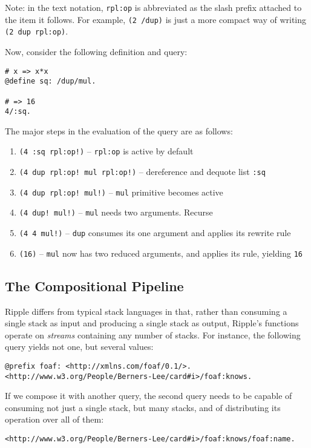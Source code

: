 \documentclass[runningheads]{llncs}
\begin{document}
Note: in the text notation, \texttt{rpl:op} is abbreviated as the slash prefix attached to the item it follows.  For example, \texttt{(2 /dup)} is just a more compact way of writing \texttt{(2 dup rpl:op)}.

Now, consider the following definition and query:

\begin{verbatim}
# x => x*x
@define sq: /dup/mul.

# => 16
4/:sq.
\end{verbatim}
The major steps in the evaluation of the query are as follows:
\begin{enumerate}
\item \texttt{(4 :sq rpl:op!)} -- \texttt{rpl:op} is active by default
\item \texttt{(4 dup rpl:op! mul rpl:op!)} -- dereference and dequote list \texttt{:sq}
\item \texttt{(4 dup rpl:op! mul!)} -- \texttt{mul} primitive becomes active
\item \texttt{(4 dup! mul!)} -- \texttt{mul} needs two arguments.  Recurse
\item \texttt{(4 4 mul!)} -- \texttt{dup} consumes its one argument and applies its rewrite rule
\item \texttt{(16)} -- \texttt{mul} now has two reduced arguments, and applies its rule, yielding \texttt{16}
\end{enumerate}

\subsection{The Compositional Pipeline}

Ripple differs from typical stack languages in that, rather than consuming a single stack as input and producing a single stack as output, Ripple's functions operate on \textit{streams} containing any number of stacks.  For instance, the following query yields not one, but several values:
\begin{verbatim}
@prefix foaf: <http://xmlns.com/foaf/0.1/>.
<http://www.w3.org/People/Berners-Lee/card#i>/foaf:knows.
\end{verbatim}

If we compose it with another query, the second query needs to be capable of consuming not just a single stack, but many stacks, and of distributing its operation over all of them:
\begin{verbatim}
<http://www.w3.org/People/Berners-Lee/card#i>/foaf:knows/foaf:name.
\end{verbatim}
\end{document}
